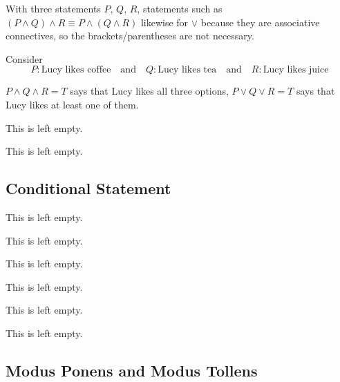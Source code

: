 With three statements $P$, $Q$, $R$, statements such as $(P \land Q) \land R \equiv P \land (Q \land R)$ likewise for $\lor$ because they are associative connectives, so the brackets/parentheses are not necessary.

\begin{example}
    Consider
    $$
    P: \text{Lucy likes coffee} \quad \text{and} \quad Q: \text{Lucy likes tea} \quad \text{and} \quad R: \text{Lucy likes juice}
    $$

    $P \land Q \land R = T$ says that Lucy likes all three options, $P \lor Q \lor R = T$ says that Lucy likes at least one of them.
\end{example}

\begin{example}
    This is left empty.
\end{example}

\begin{example}
    This is left empty.
\end{example}

\subsection{Conditional Statement}

\begin{remark}
    This is left empty.
\end{remark}

\begin{remark}
    This is left empty.
\end{remark}

\begin{example}
    This is left empty.
\end{example}

\begin{example}
    This is left empty.
\end{example}

\begin{example}
    This is left empty.
\end{example}

\begin{remark}
    This is left empty.
\end{remark}

\subsection{Modus Ponens and Modus Tollens}

